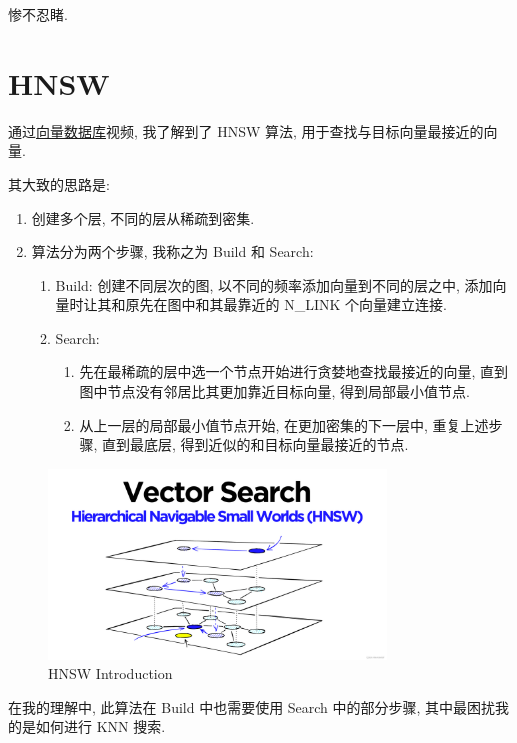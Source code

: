 惨不忍睹.


\section{HNSW}

通过\href{https://www.bilibili.com/video/BV14u4y1A7fB?p=4}{向量数据库}视频, 我了解到了 HNSW 算法,
用于查找与目标向量最接近的向量.

其大致的思路是:

\begin{enumerate}
    \item 创建多个层, 不同的层从稀疏到密集.
    \item 算法分为两个步骤, 我称之为 Build 和 Search:
    \begin{enumerate}
        \item Build: 创建不同层次的图, 以不同的频率添加向量到不同的层之中, 添加向量时让其和原先在图中和其最靠近的 N\_LINK 个向量建立连接.
        \item Search:
        \begin{enumerate}
            \item 先在最稀疏的层中选一个节点开始进行贪婪地查找最接近的向量, 直到图中节点没有邻居比其更加靠近目标向量, 得到局部最小值节点.
            \item 从上一层的局部最小值节点开始, 在更加密集的下一层中, 重复上述步骤, 直到最底层, 得到近似的和目标向量最接近的节点.
        \end{enumerate}
    \end{enumerate}
\end{enumerate}

\begin{figure}[H]
    \centering
    \includegraphics[width=0.8\textwidth]{hnsw-intro-img}
    \caption{HNSW Introduction}
\end{figure}

在我的理解中, 此算法在 Build 中也需要使用 Search 中的部分步骤, 其中最困扰我的是如何进行 KNN 搜索.

